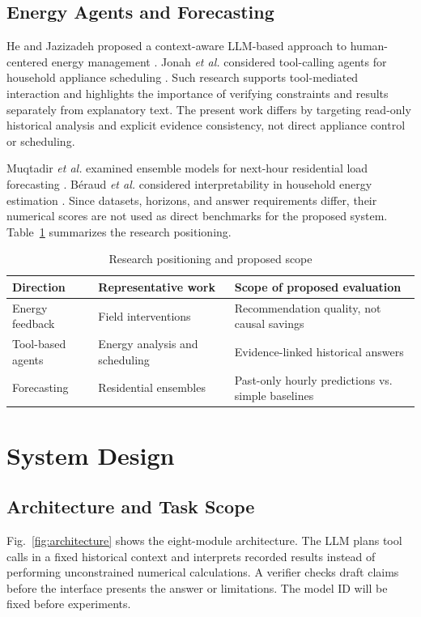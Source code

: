 \documentclass[conference]{IEEEtran}
\begin{document}
\subsection{Energy Agents and Forecasting}
He and Jazizadeh proposed a context-aware LLM-based approach to human-centered energy management \cite{he2025}. Jonah \textit{et al.} considered tool-calling agents for household appliance scheduling \cite{jonah2026}. Such research supports tool-mediated interaction and highlights the importance of verifying constraints and results separately from explanatory text. The present work differs by targeting read-only historical analysis and explicit evidence consistency, not direct appliance control or scheduling.

Muqtadir \textit{et al.} examined ensemble models for next-hour residential load forecasting \cite{muqtadir2025}. B\'eraud \textit{et al.} considered interpretability in household energy estimation \cite{beraud2024}. Since datasets, horizons, and answer requirements differ, their numerical scores are not used as direct benchmarks for the proposed system. Table~\ref{tab:related} summarizes the research positioning.

\begin{table}[t]
\caption{Research positioning and proposed scope}
\label{tab:related}
\centering\footnotesize
\begin{tabularx}{\columnwidth}{@{}p{}X X@{}}
\toprule
Direction & Representative work & Scope of proposed evaluation \\
\midrule
Energy feedback & Field interventions \cite{boomsma2025,paunov2026} & Recommendation quality, not causal savings \\
Tool-based agents & Energy analysis and scheduling \cite{he2025,jonah2026} & Evidence-linked historical answers \\
Forecasting & Residential ensembles \cite{muqtadir2025,beraud2024} & Past-only hourly predictions vs. simple baselines \\
\bottomrule
\end{tabularx}
\end{table}

\section{System Design}
\subsection{Architecture and Task Scope}
Fig.~\ref{fig:architecture} shows the eight-module architecture. The LLM plans tool calls in a fixed historical context and interprets recorded results instead of performing unconstrained numerical calculations. A verifier checks draft claims before the interface presents the answer or limitations. The model ID will be fixed before experiments.
\end{document}
